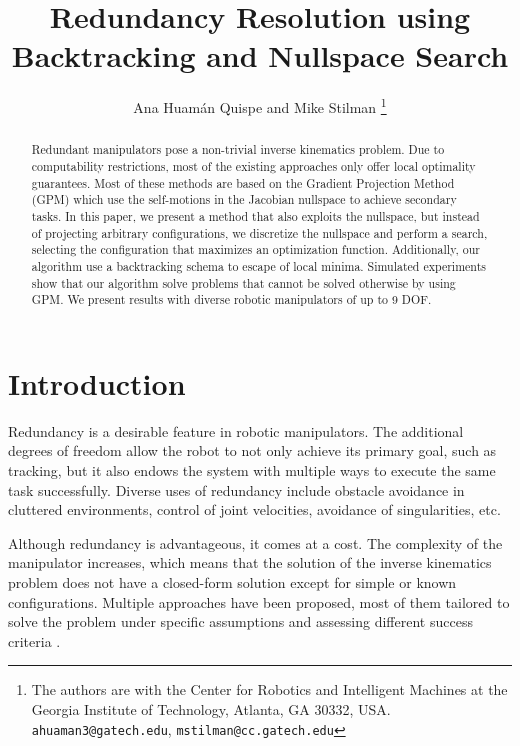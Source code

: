 \documentclass[conference]{IEEEtran}
\begin{document}
\title{Redundancy Resolution using Backtracking and Nullspace Search}
\author{Ana Huam\'an Quispe and Mike Stilman%
  \thanks{The authors are with the Center for Robotics and Intelligent
    Machines at the Georgia Institute of Technology, Atlanta, GA
    30332, USA. {\tt\small ahuaman3@gatech.edu}, {\tt\small mstilman@cc.gatech.edu}}}
\maketitle

\begin{abstract}
Redundant manipulators pose a non-trivial inverse kinematics problem.
Due to computability restrictions, most of the existing approaches only offer
local optimality guarantees. Most of these methods are based on the Gradient
Projection Method (GPM)\cite{liegeois-ns-1977} which use the self-motions in the
Jacobian nullspace to achieve secondary tasks. In this paper, we present a method that 
also exploits the nullspace, but instead of projecting arbitrary configurations, we discretize
the nullspace and perform a search, selecting the configuration that maximizes
an optimization function. Additionally, our algorithm use a backtracking schema 
to escape of local minima. Simulated experiments show that our algorithm solve
problems that cannot be solved otherwise by using GPM.
We present results with diverse robotic manipulators of up to 9 DOF.  
\end{abstract}

\section{Introduction}
Redundancy is a desirable feature in robotic manipulators. The 
additional degrees of freedom allow the robot to not only achieve
its primary goal, such as tracking, but 
it also endows the system with multiple ways to execute the same 
task successfully. Diverse uses of redundancy include obstacle 
avoidance in cluttered environments, control of joint velocities,
avoidance of singularities, etc.

Although redundancy is advantageous, it comes at a
 cost. The complexity of the manipulator increases, which means
that the solution of the inverse kinematics problem does not have
a closed-form solution except for simple or known configurations.
Multiple approaches have been proposed, most of them tailored to
solve the problem under specific assumptions and assessing different
success criteria \cite{hooper-ns-1995}. 
\end{document}
